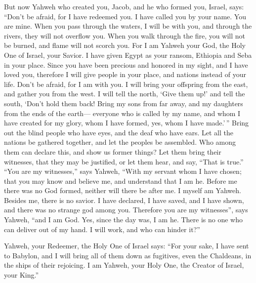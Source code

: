  But now Yahweh who created you, Jacob, and he who formed
you, Israel, says: ``Don't be afraid, for I have redeemed you. I have
called you by your name. You are mine.  When you pass
through the waters, I will be with you, and through the rivers, they
will not overflow you. When you walk through the fire, you will not be
burned, and flame will not scorch you.  For I am Yahweh
your God, the Holy One of Israel, your Savior. I have given Egypt as
your ransom, Ethiopia and Seba in your place.  Since you
have been precious and honored in my sight, and I have loved you,
therefore I will give people in your place, and nations instead of your
life.  Don't be afraid, for I am with you. I will bring
your offspring from the east, and gather you from the west.
 I will tell the north, `Give them up!' and tell the
south, `Don't hold them back! Bring my sons from far away, and my
daughters from the ends of the earth---  everyone who is
called by my name, and whom I have created for my glory, whom I have
formed, yes, whom I have made.'\,''  Bring out the blind
people who have eyes, and the deaf who have ears.  Let all
the nations be gathered together, and let the peoples be assembled. Who
among them can declare this, and show us former things? Let them bring
their witnesses, that they may be justified, or let them hear, and say,
``That is true.''  ``You are my witnesses,'' says Yahweh,
``With my servant whom I have chosen; that you may know and believe me,
and understand that I am he. Before me there was no God formed, neither
will there be after me.  I myself am Yahweh. Besides me,
there is no savior.  I have declared, I have saved, and I
have shown, and there was no strange god among you. Therefore you are my
witnesses'', says Yahweh, ``and I am God.  Yes, since the
day was, I am he. There is no one who can deliver out of my hand. I will
work, and who can hinder it?''

 Yahweh, your Redeemer, the Holy One of Israel says:
``For your sake, I have sent to Babylon, and I will bring all of them
down as fugitives, even the Chaldeans, in the ships of their rejoicing.
 I am Yahweh, your Holy One, the Creator of Israel, your
King.''

